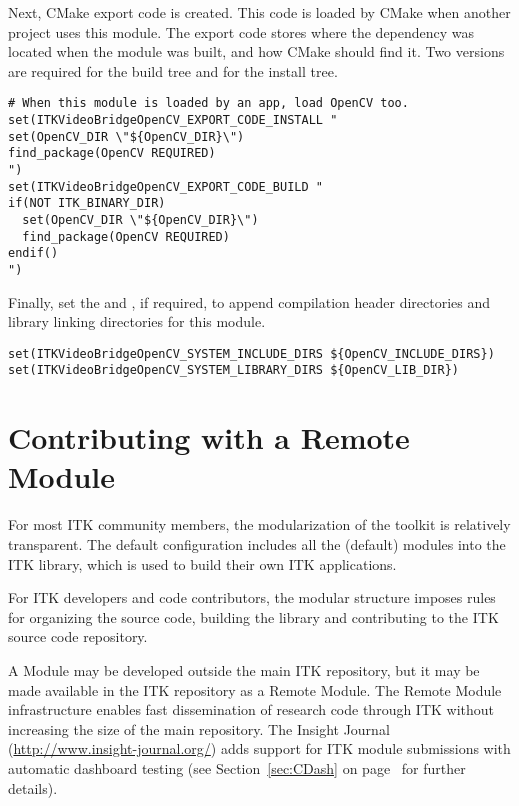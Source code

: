 Next, CMake export code is created. This code is loaded by CMake when another
project uses this module. The export code stores where the dependency was
located when the module was built, and how CMake should find it. Two versions
are required for the build tree and for the install tree.

\begin{verbatim}
# When this module is loaded by an app, load OpenCV too.
set(ITKVideoBridgeOpenCV_EXPORT_CODE_INSTALL "
set(OpenCV_DIR \"${OpenCV_DIR}\")
find_package(OpenCV REQUIRED)
")
set(ITKVideoBridgeOpenCV_EXPORT_CODE_BUILD "
if(NOT ITK_BINARY_DIR)
  set(OpenCV_DIR \"${OpenCV_DIR}\")
  find_package(OpenCV REQUIRED)
endif()
")
\end{verbatim}

Finally, set the  and
, if required, to append
compilation header directories and library linking directories for this
module.

\begin{verbatim}
set(ITKVideoBridgeOpenCV_SYSTEM_INCLUDE_DIRS ${OpenCV_INCLUDE_DIRS})
set(ITKVideoBridgeOpenCV_SYSTEM_LIBRARY_DIRS ${OpenCV_LIB_DIR})
\end{verbatim}

\section{Contributing with a Remote Module}
\label{sec:ContributingRemoteModules}

For most ITK community members, the modularization of the toolkit is relatively
transparent. The default configuration includes all the (default) modules into
the ITK library, which is used to build their own ITK applications.

For ITK developers and code contributors, the modular structure imposes rules
for organizing the source code, building the library and contributing to the
ITK source code repository.

A Module may be developed outside the main ITK repository, but it may be
made available in the ITK repository as a Remote Module. The Remote Module
infrastructure enables fast dissemination of research code through ITK without
increasing the size of the main repository. The Insight Journal
(\url{http://www.insight-journal.org/}) adds support for ITK module submissions
with automatic dashboard testing (see Section~\ref{sec:CDash} on
page~\pageref{sec:CDash} for further details).

